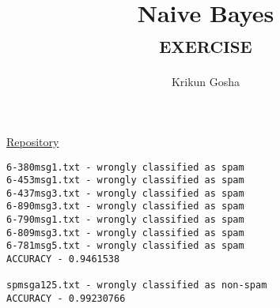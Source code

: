 \documentclass{article}
\title{Naive Bayes \\ \textsc{exercise}}
\author{Krikun Gosha}
\begin{document}
\maketitle

\href{https://github.com/kriku/ir-nb}{Repository}

\begin{verbatim}
6-380msg1.txt - wrongly classified as spam
6-453msg1.txt - wrongly classified as spam
6-437msg3.txt - wrongly classified as spam
6-890msg3.txt - wrongly classified as spam
6-790msg1.txt - wrongly classified as spam
6-809msg3.txt - wrongly classified as spam
6-781msg5.txt - wrongly classified as spam
ACCURACY - 0.9461538

spmsga125.txt - wrongly classified as non-spam
ACCURACY - 0.99230766
\end{verbatim}
\end{document}
